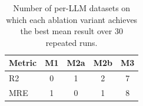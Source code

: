 \begin{table}[t]
\centering
\small
\caption{Number of per-LLM datasets on which each ablation variant achieves the best mean result over 30 repeated runs.}
\label{tab:ablation_win_counts}
\begin{tabular}{lcccc}
\toprule
Metric & M1 & M2a & M2b & M3 \\
\midrule
R2 & 0 & 1 & 2 & 7 \\
MRE & 1 & 0 & 1 & 8 \\
\bottomrule
\end{tabular}
\end{table}